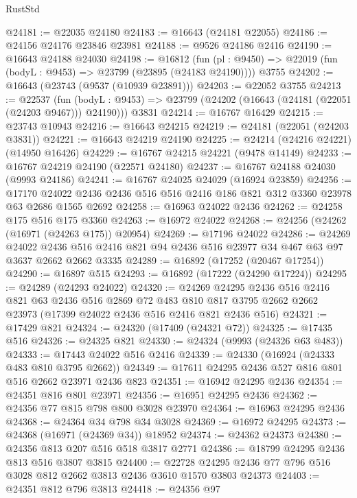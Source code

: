\begin{lexlean}{RustStd}
\begin{coremodule}
@24181 := @22035 @24180
@24183 := @16643 (@24181 @22055)
@24186 := @24156 @24176 @23846 @23981
@24188 := @9526 @24186 @2416
@24190 := @16643 @24188 @24030
@24198 := @16812
    (fun (pl : @9450) => @22019 (fun (bodyL : @9453) => @23799 (@23895 (@24183 @24190))))
    @3755
@24202 := @16643 (@23743 (@9537 (@10939 @23891)))
@24203 := @22052 @3755
@24213 := @22537
    (fun (bodyL : @9453) => @23799 (@24202 (@16643 (@24181 (@22051 (@24203 @9467))) @24190)))
    @3831
@24214 := @16767 @16429
@24215 := @23743 @10943
@24216 := @16643 @24215
@24219 := @24181 (@22051 (@24203 @3831))
@24221 := @16643 @24219 @24190
@24225 := @24214 (@24216 @24221) (@14950 @16426)
@24229 := @16767 @24215 @24221 (@9478 @14149)
@24233 := @16767 @24219 @24190 (@22571 @24180)
@24237 := @16767 @24188 @24030 (@9993 @24186)
@24241 := @16767 @24025 @24029 (@16924 @23859)
@24256 := @17170
    @24022
    @2436
    @2436
    @516
    @516
    @2416
    @186
    @821
    @312
    @3360
    @23978
    @63
    @2686
    @1565
    @2692
@24258 := @16963 @24022 @2436
@24262 := @24258 @175 @516 @175 @3360
@24263 := @16972 @24022
@24268 := @24256 (@24262 (@16971 (@24263 @175)) @20954)
@24269 := @17196 @24022
@24286 := @24269
    @24022
    @2436
    @516
    @2416
    @821
    @94
    @2436
    @516
    @23977
    @34
    @467
    @63
    @97
    @3637
    @2662
    @2662
    @3335
@24289 := @16892 (@17252 (@20467 @17254))
@24290 := @16897 @515
@24293 := @16892 (@17222 (@24290 @17224))
@24295 := @24289 (@24293 @24022)
@24320 := @24269
    @24295
    @2436
    @516
    @2416
    @821
    @63
    @2436
    @516
    @2869
    @72
    @483
    @810
    @817
    @3795
    @2662
    @2662
    @23973
    (@17399 @24022 @2436 @516 @2416 @821 @2436 @516)
@24321 := @17429 @821
@24324 := @24320 (@17409 (@24321 @72))
@24325 := @17435 @516
@24326 := @24325 @821
@24330 := @24324 (@9993 (@24326 @63 @483))
@24333 := @17443 @24022 @516 @2416
@24339 := @24330 (@16924 (@24333 @483 @810 @3795 @2662))
@24349 := @17611 @24295 @2436 @527 @816 @801 @516 @2662 @23971 @2436 @823
@24351 := @16942 @24295 @2436
@24354 := @24351 @816 @801 @23971
@24356 := @16951 @24295 @2436
@24362 := @24356 @77 @815 @798 @800 @3028 @23970
@24364 := @16963 @24295 @2436
@24368 := @24364 @34 @798 @34 @3028
@24369 := @16972 @24295
@24373 := @24368 (@16971 (@24369 @34)) @18952
@24374 := @24362 @24373
@24380 := @24356 @813 @207 @516 @518 @3817 @2771
@24386 := @18799 @24295 @2436 @813 @516 @3807 @3815
@24400 := @22728 @24295 @2436 @77 @796 @516 @3028 @812 @2662 @3813 @2436 @3610 @1570 @3803 @24373
@24403 := @24351 @812 @796 @3813
@24418 := @24356
    @97

\end{coremodule}
\end{lexlean}
